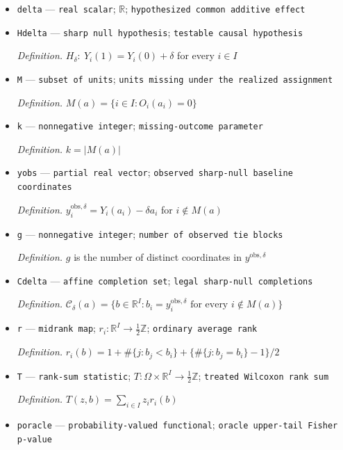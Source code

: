 \documentclass{article}
\begin{document}
\begin{itemize}
  \item \texttt{delta} --- \texttt{real scalar}; \(\mathbb R\); \texttt{hypothesized common additive effect}
  \item \texttt{Hdelta} --- \texttt{sharp null hypothesis}; \texttt{testable causal hypothesis}
  \par\smallskip\noindent\emph{Definition.} \(H_\delta:\ Y_i(1)=Y_i(0)+\delta\) for every \(i\in I\)
  \item \texttt{M} --- \texttt{subset of units}; \texttt{units missing under the realized assignment}
  \par\smallskip\noindent\emph{Definition.} \(M(a)=\{i\in I:O_i(a_i)=0\}\)
  \item \texttt{k} --- \texttt{nonnegative integer}; \texttt{missing-\allowbreak{}outcome parameter}
  \par\smallskip\noindent\emph{Definition.} \(k=|M(a)|\)
  \item \texttt{yobs} --- \texttt{partial real vector}; \texttt{observed sharp-\allowbreak{}null baseline coordinates}
  \par\smallskip\noindent\emph{Definition.} \(y_i^{\mathrm{obs},\delta}=Y_i(a_i)-\delta a_i\) for \(i\notin M(a)\)
  \item \texttt{g} --- \texttt{nonnegative integer}; \texttt{number of observed tie blocks}
  \par\smallskip\noindent\emph{Definition.} \(g\) is the number of distinct coordinates in \(y^{\mathrm{obs},\delta}\)
  \item \texttt{Cdelta} --- \texttt{affine completion set}; \texttt{legal sharp-\allowbreak{}null completions}
  \par\smallskip\noindent\emph{Definition.} \(\mathcal C_\delta(a)=\{b\in\mathbb R^I:b_i=y_i^{\mathrm{obs},\delta}\text{ for every }i\notin M(a)\}\)
  \item \texttt{r} --- \texttt{midrank map}; \(r_i:\mathbb R^I\to\tfrac12\mathbb Z\); \texttt{ordinary average rank}
  \par\smallskip\noindent\emph{Definition.} \(r_i(b)=1+\#\{j:b_j<b_i\}+\{\#\{j:b_j=b_i\}-1\}/2\)
  \item \texttt{T} --- \texttt{rank-\allowbreak{}sum statistic}; \(T:\Omega\times\mathbb R^I\to\tfrac12\mathbb Z\); \texttt{treated Wilcoxon rank sum}
  \par\smallskip\noindent\emph{Definition.} \(T(z,b)=\sum_{i\in I}z_i r_i(b)\)
  \item \texttt{poracle} --- \texttt{probability-\allowbreak{}valued functional}; \texttt{oracle upper-\allowbreak{}tail Fisher p-\allowbreak{}value}

\end{itemize}
\end{document}
